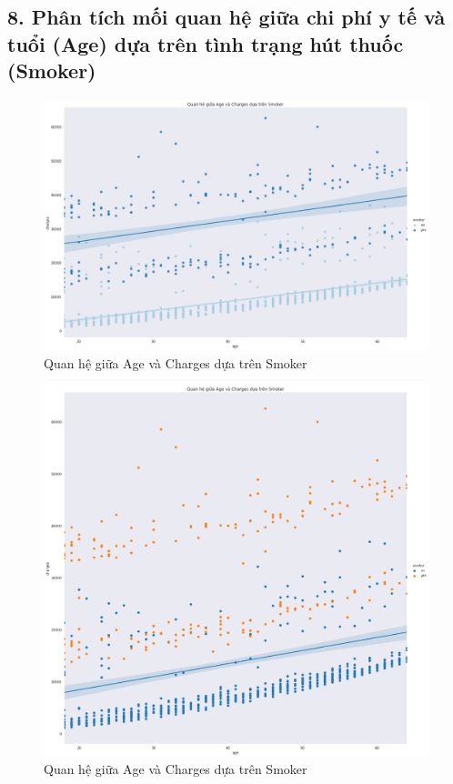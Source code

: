 \documentclass{article}
\begin{document}
	\subsection{8. Phân tích mối quan hệ giữa chi phí y tế và tuổi (Age) dựa trên tình trạng hút thuốc (Smoker)}
	\begin{figure}[H]
		\centering
		\includegraphics[width=1\textwidth]{images/age_charges_by_smoker.png}
		\caption{Quan hệ giữa Age và Charges dựa trên Smoker}
		\label{fig:writing-thesis}
	\end{figure}
	\begin{figure}[H]
		\centering
		\includegraphics[width=1\textwidth]{images/reg_age_charges_by_smoker.png}
		\caption{Quan hệ giữa Age và Charges dựa trên Smoker}
		\label{fig:writing-thesis}
	\end{figure}
	
\end{document}
